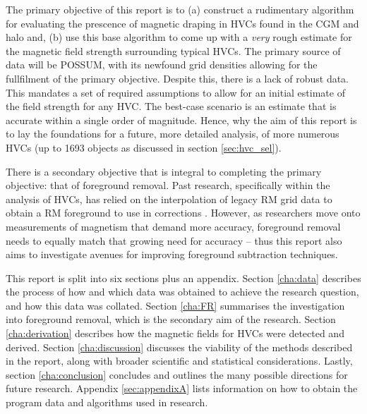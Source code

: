 The primary objective of this report is to (a) construct a rudimentary algorithm for evaluating the prescence of magnetic draping in HVCs found in the CGM and halo and, (b) use this base algorithm to come up with a \textit{very} rough estimate for the magnetic field strength surrounding typical HVCs. The primary source of data will be POSSUM, with its newfound grid densities allowing for the fullfilment of the primary objective. Despite this, there is a lack of robust data. This mandates a set of required assumptions to allow for an initial estimate of the field strength for any HVC. The best-case scenario is an estimate that is accurate within a single order of magnitude. Hence, why the aim of this report is to lay the foundations for a future, more detailed analysis, of more numerous HVCs (up to 1693 objects as discussed in section \ref{sec:hvc_sel}).


There is a secondary objective that is integral to completing the primary objective: that of foreground removal. Past research, specifically within the analysis of HVCs, has relied on the interpolation of legacy RM grid data to obtain a RM foreground to use in corrections \citep{ID21, ID3, ID26}. However, as researchers move onto measurements of magnetism that demand more accuracy, foreground removal needs to equally match that growing need for accuracy – thus this report also aims to investigate avenues for improving foreground subtraction techniques.


This report is split into six sections plus an appendix. Section \ref{cha:data} describes the process of how and which data was obtained to achieve the research question, and how this data was collated. Section \ref{cha:FR} summarises the investigation into foreground removal, which is the secondary aim of the research. Section \ref{cha:derivation} describes how the magnetic fields for HVCs were detected and derived. Section \ref{cha:discussion} discusses the viability of the methods described in the report, along with broader scientific and statistical considerations. Lastly, section \ref{cha:conclusion} concludes and outlines the many possible directions for future research. Appendix \ref{sec:appendixA} lists information on how to obtain the program data and algorithms used in research.